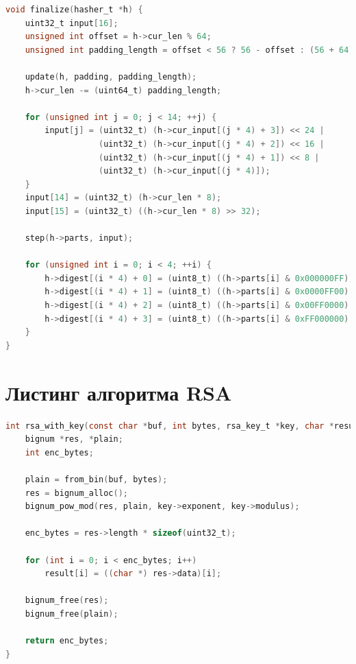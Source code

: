 \begin{lstlisting}[language=C, label=lst:md5, caption={Реализация алгоритма MD5}]
void finalize(hasher_t *h) {
    uint32_t input[16];
    unsigned int offset = h->cur_len % 64;
    unsigned int padding_length = offset < 56 ? 56 - offset : (56 + 64) - offset;

    update(h, padding, padding_length);
    h->cur_len -= (uint64_t) padding_length;

    for (unsigned int j = 0; j < 14; ++j) {
        input[j] = (uint32_t) (h->cur_input[(j * 4) + 3]) << 24 |
                   (uint32_t) (h->cur_input[(j * 4) + 2]) << 16 |
                   (uint32_t) (h->cur_input[(j * 4) + 1]) << 8 |
                   (uint32_t) (h->cur_input[(j * 4)]);
    }
    input[14] = (uint32_t) (h->cur_len * 8);
    input[15] = (uint32_t) ((h->cur_len * 8) >> 32);

    step(h->parts, input);

    for (unsigned int i = 0; i < 4; ++i) {
        h->digest[(i * 4) + 0] = (uint8_t) ((h->parts[i] & 0x000000FF));
        h->digest[(i * 4) + 1] = (uint8_t) ((h->parts[i] & 0x0000FF00) >> 8);
        h->digest[(i * 4) + 2] = (uint8_t) ((h->parts[i] & 0x00FF0000) >> 16);
        h->digest[(i * 4) + 3] = (uint8_t) ((h->parts[i] & 0xFF000000) >> 24);
    }
}
\end{lstlisting}


\section{Листинг алгоритма RSA}

\begin{lstlisting}[language=C, label=lst:rsa, caption={Реализация алгоритма RSA}]
int rsa_with_key(const char *buf, int bytes, rsa_key_t *key, char *result) {
    bignum *res, *plain;
    int enc_bytes;

    plain = from_bin(buf, bytes);
    res = bignum_alloc();
    bignum_pow_mod(res, plain, key->exponent, key->modulus);

    enc_bytes = res->length * sizeof(uint32_t);

    for (int i = 0; i < enc_bytes; i++)
        result[i] = ((char *) res->data)[i];

    bignum_free(res);
    bignum_free(plain);

    return enc_bytes;
}
\end{lstlisting}

